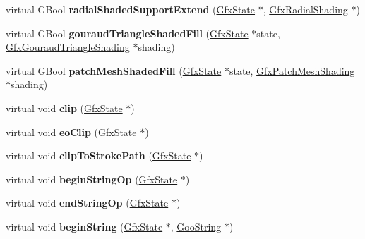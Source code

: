 \begin{DoxyCompactItemize}
virtual G\+Bool {\bfseries radial\+Shaded\+Support\+Extend} (\hyperlink{class_gfx_state}{Gfx\+State} $\ast$, \hyperlink{class_gfx_radial_shading}{Gfx\+Radial\+Shading} $\ast$)
\item 
\mbox{\label{class_output_dev_a9c03f7f5128797d0ff6026fdc0be7091}} 
virtual G\+Bool {\bfseries gouraud\+Triangle\+Shaded\+Fill} (\hyperlink{class_gfx_state}{Gfx\+State} $\ast$state, \hyperlink{class_gfx_gouraud_triangle_shading}{Gfx\+Gouraud\+Triangle\+Shading} $\ast$shading)
\item 
\mbox{\label{class_output_dev_ae8682d4076d88334a1b837ec8fc8b5a5}} 
virtual G\+Bool {\bfseries patch\+Mesh\+Shaded\+Fill} (\hyperlink{class_gfx_state}{Gfx\+State} $\ast$state, \hyperlink{class_gfx_patch_mesh_shading}{Gfx\+Patch\+Mesh\+Shading} $\ast$shading)
\item 
\mbox{\label{class_output_dev_ad29af51b92ec67117ef04c31a3a7cd8b}} 
virtual void {\bfseries clip} (\hyperlink{class_gfx_state}{Gfx\+State} $\ast$)
\item 
\mbox{\label{class_output_dev_ab7f90de29bab85a8ccb3331889363bc1}} 
virtual void {\bfseries eo\+Clip} (\hyperlink{class_gfx_state}{Gfx\+State} $\ast$)
\item 
\mbox{\label{class_output_dev_a1240052875f7a0bfdc1e849b3ad957d5}} 
virtual void {\bfseries clip\+To\+Stroke\+Path} (\hyperlink{class_gfx_state}{Gfx\+State} $\ast$)
\item 
\mbox{\label{class_output_dev_af0a25f677aa1a95e2a6e060b1dc81e9f}} 
virtual void {\bfseries begin\+String\+Op} (\hyperlink{class_gfx_state}{Gfx\+State} $\ast$)
\item 
\mbox{\label{class_output_dev_adda0f049d956b26ee965e73aa0081282}} 
virtual void {\bfseries end\+String\+Op} (\hyperlink{class_gfx_state}{Gfx\+State} $\ast$)
\item 
\mbox{\label{class_output_dev_abc90da88fb9ee1e10d3b60b4821a75d8}} 
virtual void {\bfseries begin\+String} (\hyperlink{class_gfx_state}{Gfx\+State} $\ast$, \hyperlink{class_goo_string}{Goo\+String} $\ast$)
\item 

\end{DoxyCompactItemize}
